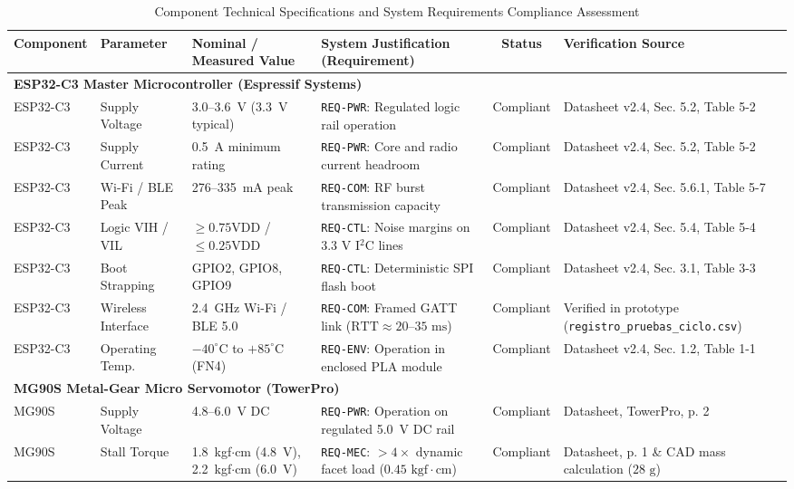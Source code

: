 \documentclass[lettersize,journal]{IEEEtran}
\begin{document}
	\begin{table}[!t]
		\centering
		\caption{Component Technical Specifications and System Requirements Compliance Assessment}
		\label{tab:compliance}
		\scriptsize
		\renewcommand{\arraystretch}{0.86}
		\begin{tabular}{p{1.9cm} p{2.6cm} p{3.1cm} p{3.7cm} c p{3.5cm}}
			\toprule
			\textbf{Component} & \textbf{Parameter} & \textbf{Nominal / Measured Value} & \textbf{System Justification (Requirement)} & \textbf{Status} & \textbf{Verification Source} \\
			\midrule
			\multicolumn{6}{l}{\textbf{ESP32-C3 Master Microcontroller (Espressif Systems)}} \\
			ESP32-C3 & Supply Voltage & 3.0--3.6~V (3.3~V typical) & \texttt{REQ-PWR}: Regulated logic rail operation & Compliant & Datasheet v2.4, Sec. 5.2, Table 5-2 \\
			ESP32-C3 & Supply Current & 0.5~A minimum rating & \texttt{REQ-PWR}: Core and radio current headroom & Compliant & Datasheet v2.4, Sec. 5.2, Table 5-2 \\
			ESP32-C3 & Wi-Fi / BLE Peak & 276--335~mA peak & \texttt{REQ-COM}: RF burst transmission capacity & Compliant & Datasheet v2.4, Sec. 5.6.1, Table 5-7 \\
			ESP32-C3 & Logic VIH / VIL & $\ge 0.75\text{VDD}$ / $\le 0.25\text{VDD}$ & \texttt{REQ-CTL}: Noise margins on $3.3\text{ V}$ I$^2$C lines & Compliant & Datasheet v2.4, Sec. 5.4, Table 5-4 \\
			ESP32-C3 & Boot Strapping & GPIO2, GPIO8, GPIO9 & \texttt{REQ-CTL}: Deterministic SPI flash boot & Compliant & Datasheet v2.4, Sec. 3.1, Table 3-3 \\
			ESP32-C3 & Wireless Interface & 2.4~GHz Wi-Fi / BLE 5.0 & \texttt{REQ-COM}: Framed GATT link ($\text{RTT} \approx 20\text{--}35\text{ ms}$) & Compliant & Verified in prototype (\texttt{registro\_pruebas\_ciclo.csv}) \\
			ESP32-C3 & Operating Temp. & $-40^\circ\text{C}$ to $+85^\circ\text{C}$ (FN4) & \texttt{REQ-ENV}: Operation in enclosed PLA module & Compliant & Datasheet v2.4, Sec. 1.2, Table 1-1 \\
			\midrule
			\multicolumn{6}{l}{\textbf{MG90S Metal-Gear Micro Servomotor (TowerPro)}} \\
			MG90S & Supply Voltage & 4.8--6.0~V DC & \texttt{REQ-PWR}: Operation on regulated 5.0~V DC rail & Compliant & Datasheet, TowerPro, p. 2 \\
			MG90S & Stall Torque & 1.8~kgf$\cdot$cm (4.8~V), 2.2~kgf$\cdot$cm (6.0~V) & \texttt{REQ-MEC}: $>4\times$ dynamic facet load ($0.45\text{ kgf}\cdot\text{cm}$) & Compliant & Datasheet, p. 1 \& CAD mass calculation ($28\text{ g}$) \\

\end{tabular}
\end{table}
\end{document}
